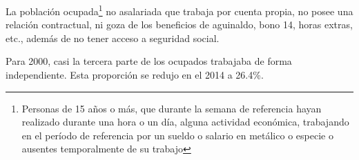 La población ocupada\footnote{Personas de 15 años o más, que durante la semana de referencia hayan realizado durante una hora o un día, alguna actividad económica, trabajando en el período de referencia por un sueldo o salario en metálico o especie o ausentes temporalmente de su trabajo} no asalariada que trabaja por cuenta propia, no posee una relación contractual, ni goza de los beneficios de aguinaldo, bono 14, horas extras, etc., además de no tener acceso a seguridad social.

 Para 2000, casi   la tercera parte de los ocupados trabajaba de forma independiente. Esta proporción se redujo en el 2014 a 26.4\%.